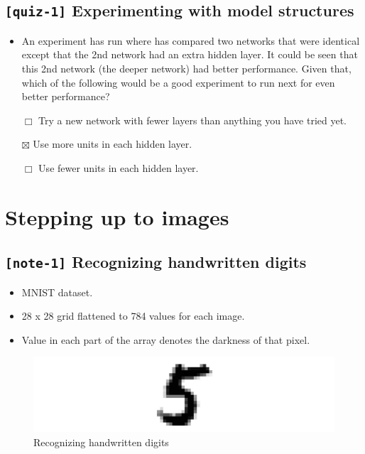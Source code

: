 \documentclass[11pt, twoside]{article}
\begin{document}
    \hypertarget{quiz-1-experimenting-with-model-structures}{%
\subsection{\texorpdfstring{\texttt{{[}quiz-1{]}} Experimenting with
model
structures}{{[}quiz-1{]} Experimenting with model structures}}\label{quiz-1-experimenting-with-model-structures}}

\begin{itemize}
\item
  An experiment has run where has compared two networks that were
  identical except that the 2nd network had an extra hidden layer. It
  could be seen that this 2nd network (the deeper network) had better
  performance. Given that, which of the following would be a good
  experiment to run next for even better performance?

  \(\Box\) Try a new network with fewer layers than anything you have
  tried yet.

  \(\boxtimes\) Use more units in each hidden layer.

  \(\Box\) Use fewer units in each hidden layer.
\end{itemize}

    \hypertarget{stepping-up-to-images}{%
\section{Stepping up to images}\label{stepping-up-to-images}}

    \hypertarget{note-1-recognizing-handwritten-digits}{%
\subsection{\texorpdfstring{\texttt{{[}note-1{]}} Recognizing
handwritten
digits}{{[}note-1{]} Recognizing handwritten digits}}\label{note-1-recognizing-handwritten-digits}}

\begin{itemize}
\item
  MNIST dataset.
\item
  28 x 28 grid flattened to 784 values for each image.
\item
  Value in each part of the array denotes the darkness of that pixel.
\end{itemize}

\begin{figure}
\centering
\includegraphics{../Figures/5. Recognizing handwritten digits.jpg}
\caption{Recognizing handwritten digits}
\end{figure}
\end{document}
